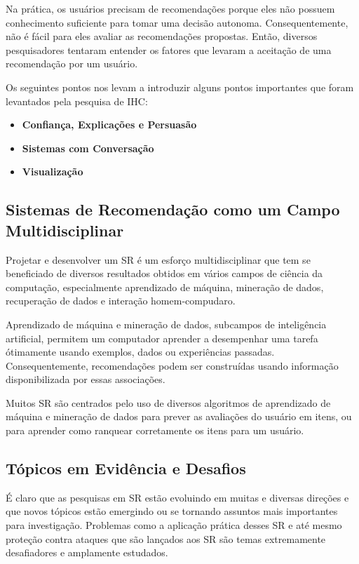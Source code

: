 \par
Na prática, os usuários precisam de recomendações porque eles não possuem conhecimento suficiente para tomar uma decisão autonoma. Consequentemente, não é fácil para eles avaliar as recomendações propostas. Então, diversos pesquisadores tentaram entender os fatores que levaram a aceitação de uma recomendação por um usuário.

\par
Os seguintes pontos nos levam a introduzir alguns pontos importantes que foram levantados pela pesquisa de IHC:

\begin{itemize}
  \item \textbf{Confiança, Explicações e Persuasão}
  \item \textbf{Sistemas com Conversação}
  \item \textbf{Visualização}
\end{itemize}

\subsection{Sistemas de Recomendação como um Campo Multidisciplinar}

Projetar e desenvolver um SR é um esforço multidisciplinar que tem se beneficiado de diversos resultados obtidos em vários campos de ciência da computação, especialmente aprendizado de máquina, mineração de dados, recuperação de dados e interação homem-compudaro.

\par
Aprendizado de máquina e mineração de dados, subcampos de inteligência artificial, permitem um computador aprender a desempenhar uma tarefa ótimamente usando exemplos, dados ou experiências passadas. Consequentemente, recomendações podem ser construídas usando informação disponibilizada por essas associações.
\par
Muitos SR são centrados pelo uso de diversos algoritmos de aprendizado de máquina e mineração de dados para prever as avaliações do usuário em itens, ou para aprender como ranquear corretamente os itens para um usuário.

\subsection{Tópicos em Evidência e Desafios}

É claro que as pesquisas em SR estão evoluindo em muitas e diversas direções e que novos tópicos estão emergindo ou se tornando assuntos mais importantes para investigação. Problemas como a aplicação prática desses SR e até mesmo proteção contra ataques que são lançados aos SR são temas extremamente desafiadores e amplamente estudados.

